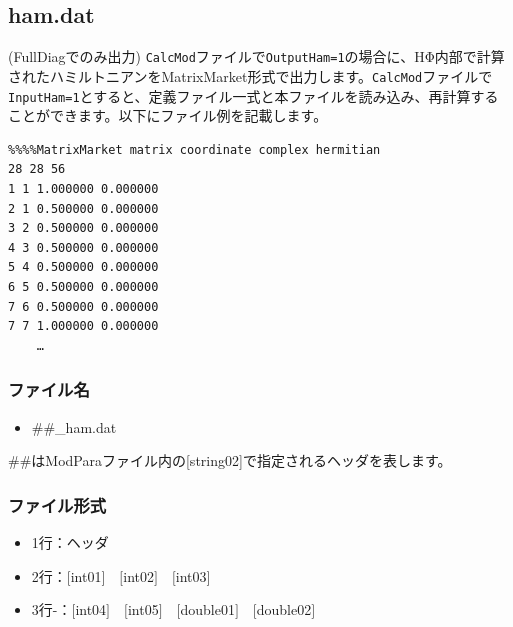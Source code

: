\newpage
\subsection{ham.dat}
\label{Subsec:ham}
(FullDiagでのみ出力) \verb$CalcMod$ファイルで\verb$OutputHam=1$の場合に、HΦ内部で計算されたハミルトニアンをMatrixMarket形式で出力します。\verb$CalcMod$ファイルで\verb$InputHam=1$とすると、定義ファイル一式と本ファイルを読み込み、再計算することができます。以下にファイル例を記載します。

\begin{minipage}{12.5cm}
\begin{screen}
\begin{verbatim}
%%%%MatrixMarket matrix coordinate complex hermitian
28 28 56
1 1 1.000000 0.000000
2 1 0.500000 0.000000
3 2 0.500000 0.000000
4 3 0.500000 0.000000
5 4 0.500000 0.000000
6 5 0.500000 0.000000
7 6 0.500000 0.000000
7 7 1.000000 0.000000
    …
\end{verbatim}
\end{screen}
\end{minipage}

\subsubsection{ファイル名}
 \begin{itemize}
 \item \#\#\_ham.dat
 \end{itemize}
 \#\#はModParaファイル内の[string02]で指定されるヘッダを表します。


\subsubsection{ファイル形式}
 \begin{itemize}
   \item  1行：ヘッダ
   \item  2行：$[$int01$]$~~$[$int02$]$~~$[$int03$]$
   \item  3行-：$[$int04$]$~~$[$int05$]$~~$[$double01$]$~~$[$double02$]$
  \end{itemize}
